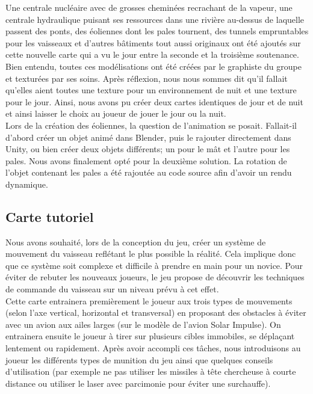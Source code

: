 \documentclass[12pt, titlepage]{article}
\begin{document}
\begin{spacing}{1.5}
Une centrale nucléaire avec de grosses cheminées recrachant de la vapeur, une centrale hydraulique puisant ses ressources dans une rivière au-dessus de laquelle passent des ponts, des éoliennes dont les pales tournent, des tunnels empruntables pour les vaisseaux et d’autres bâtiments tout aussi originaux ont été ajoutés sur cette nouvelle carte qui a vu le jour entre la seconde et la troisième soutenance. Bien entendu, toutes ces modélisations ont été créées par le graphiste du groupe et texturées par ses soins. Après réflexion, nous nous sommes dit qu'il fallait qu'elles aient toutes une texture pour un environnement de nuit et une texture pour le jour. Ainsi, nous avons pu créer deux cartes identiques de jour et de nuit et ainsi laisser le choix au joueur de jouer le jour ou la nuit.\\

Lors de la création des éoliennes, la question de l'animation se posait. Fallait-il d'abord créer un objet animé dans Blender, puis le rajouter directement dans Unity, ou bien créer deux objets différents; un pour le mât et l'autre pour les pales. Nous avons finalement opté pour la deuxième solution. La rotation de l'objet contenant les pales a été rajoutée au code source afin d'avoir un rendu dynamique.

\subsection{Carte tutoriel}

 Nous avons souhaité, lors de la conception du jeu, créer un système de mouvement du vaisseau reflétant le plus possible la réalité. Cela implique donc que ce système soit complexe et difficile à prendre en main pour un novice. Pour éviter de rebuter les nouveaux joueurs, le jeu propose de découvrir les techniques de commande du vaisseau sur un niveau prévu à cet effet. \\

Cette carte entrainera premièrement le joueur aux trois types de mouvements (selon l'axe vertical, horizontal et transversal) en proposant des obstacles à éviter avec un avion aux ailes larges (sur le modèle de l'avion Solar Impulse). On entrainera ensuite le joueur à tirer sur plusieurs cibles immobiles, se déplaçant lentement ou rapidement. Après avoir accompli ces tâches, nous introduisons au joueur les différents types de munition du jeu ainsi que quelques conseils d'utilisation (par exemple ne pas utiliser les missiles à tête chercheuse à courte distance ou utiliser le laser avec parcimonie pour éviter une surchauffe). \\


\end{spacing}
\end{document}
